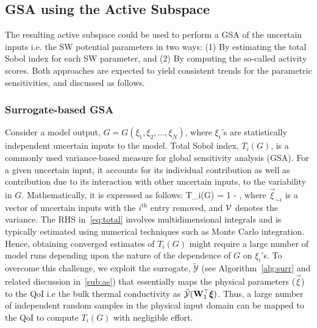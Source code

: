 \subsection{GSA using the Active Subspace}
\label{sub:scores} 

The resulting active subspace could be used to perform a GSA of the uncertain inputs i.e. the SW potential
parameters in two ways: (1) By estimating the total Sobol index for each SW parameter, and (2) By computing
the so-called activity scores. Both approaches are expected to yield consistent trends for the parametric 
sensitivities, and discussed as follows. 

\subsubsection{Surrogate-based GSA}
\label{subsub:gsa_surr}

Consider a model output, $G= G(\xi_1,\xi_2,\ldots,\xi_N)$, where $\xi_i$'s are statistically independent uncertain
inputs to the model. Total Sobol index, $T_i(G)$, is a commonly used variance-based measure for global sensitivity 
analysis (GSA). For a given uncertain input, it accounts for its individual contribution as well as contribution due to
its interaction with other uncertain inputs, to the variability in $G$. Mathematically, it is expressed as follows:
%
\be
T_i(G) = 1 - 
,
\label{eq:total}
\ee
%
where $\vec{\xi}_{\sim i}$ is a vector of uncertain inputs with the  $i^\text{th}$ entry removed, and $\mathcal{V}$ denotes the 
variance. The RHS in~\eqref{eq:total} involves multidimensional integrals and is typically estimated using numerical
techniques such as Monte Carlo integration. Hence, obtaining converged estimates of $T_i(G)$ might require a large 
number of model runs depending upon the nature of the dependence of $G$ on $\xi_i$'s. To overcome this challenge,
we exploit the surrogate, $\tilde{\mathcal{Y}}$ (see Algorithm~\ref{alg:surr} and related discussion in~\ref{sub:as})
that essentially maps the physical parameters ($\vec{\xi}$) to the QoI i.e the bulk thermal conductivity as 
$\tilde{\mathcal{Y}}(\mat{W}_1^\top\vec{\xi})$.
Thus, a large number of
independent random samples in the physical input domain can be mapped to the QoI to compute $T_i(G)$
with negligible effort. 

